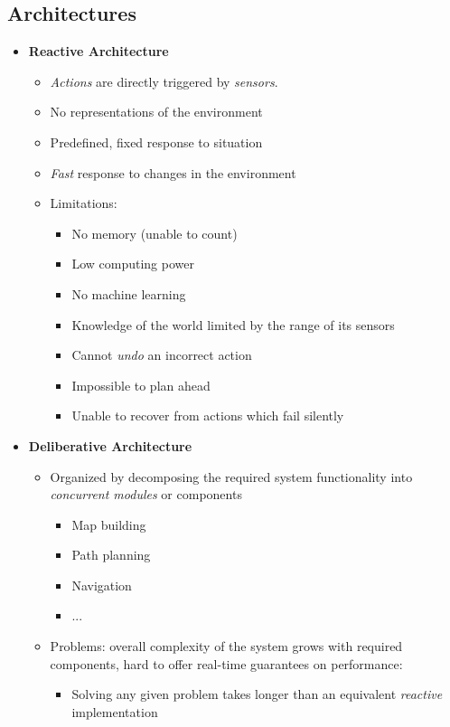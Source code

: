 \documentclass[13pt]{article}
\begin{document}
\subsection{Architectures}%
\noindent
\begin{itemize}
	\item \textbf{Reactive Architecture}
	\begin{itemize}
		\item \textit{Actions} are directly triggered by \textit{sensors}.
		\item No representations of the environment
		\item Predefined, fixed response to situation
		\item \textit{Fast} response to changes in the environment
		\item Limitations:
		\begin{itemize}
			\item No memory (unable to count)
			\item Low computing power
			\item No machine learning
			\item Knowledge of the world limited by the range of its sensors
			\item Cannot \textit{undo} an incorrect action
			\item Impossible to plan ahead
			\item Unable to recover from actions which fail silently
		\end{itemize}
	\end{itemize}
	\item \textbf{Deliberative Architecture}
	\begin{itemize}
		\item Organized by decomposing the required system functionality into \textit{concurrent modules} or components
		\begin{itemize}
			\item Map building
			\item Path planning
			\item Navigation
			\item ...
		\end{itemize}
		\item Problems: overall complexity of the system grows with required components, hard to offer real-time
		guarantees on performance:
		\begin{itemize}
			\item Solving any given problem takes longer than an equivalent \textit{reactive} implementation

\end{itemize}
\end{itemize}
\end{itemize}
\end{document}
